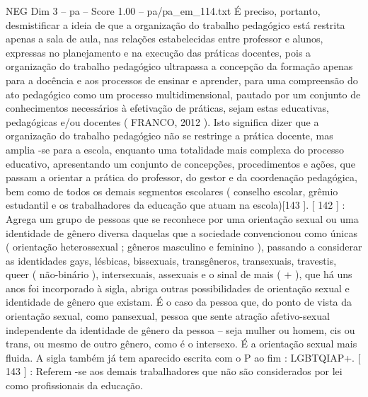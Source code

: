 \begin{textsample}{NEG Dim 3 – pa – Score 1.00 – pa/pa\_em\_114.txt}
É preciso, portanto, desmistificar a ideia de que a organização do trabalho pedagógico está restrita apenas a sala de aula, nas relações estabelecidas entre professor e alunos, expressas no planejamento e na execução das práticas docentes, pois a organização do trabalho pedagógico ultrapassa a concepção da formação apenas para a docência e aos processos de ensinar e aprender, para uma compreensão do ato pedagógico como um processo multidimensional, pautado por um conjunto de conhecimentos necessários à efetivação de práticas, sejam estas educativas, pedagógicas e/ou docentes ( FRANCO, 2012 ).
Isto significa dizer que a organização do trabalho pedagógico não se restringe a prática docente, mas amplia -se para a escola, enquanto uma totalidade mais complexa do processo educativo, apresentando um conjunto de concepções, procedimentos e ações, que passam a orientar a prática do professor, do gestor e da coordenação pedagógica, bem como de todos os demais segmentos escolares ( conselho escolar, grêmio estudantil e os trabalhadores da educação que atuam na escola)[143 ]. [ 142 ] : Agrega um grupo de pessoas que se reconhece por uma orientação sexual ou uma identidade de gênero diversa daquelas que a sociedade convencionou como únicas ( orientação heterossexual ; gêneros masculino e feminino ), passando a considerar as identidades gays, lésbicas, bissexuais, transgêneros, transexuais, travestis, queer ( não-binário ), intersexuais, assexuais e o sinal de mais ( + ), que há uns anos foi incorporado à sigla, abriga outras possibilidades de orientação sexual e identidade de gênero que existam.
É o caso da pessoa que, do ponto de vista da orientação sexual, como pansexual, pessoa que sente atração afetivo-sexual independente da identidade de gênero da pessoa – seja mulher ou homem, cis ou trans, ou mesmo de outro gênero, como é o intersexo.
É a orientação sexual mais fluida.
A sigla também já tem aparecido escrita com o P ao fim : LGBTQIAP+. [ 143 ] : Referem -se aos demais trabalhadores que não são considerados por lei como profissionais da educação.

\end{textsample}
